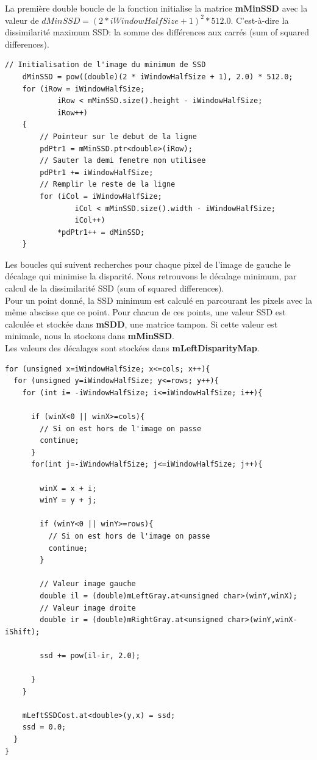 \documentclass[a4paper,11pt]{article}
\begin{document}
La première double boucle de la fonction initialise la matrice
\textbf{mMinSSD} avec la valeur de $dMinSSD = (2 * iWindowHalfSize + 1)^2 * 512.0$. 
C'est-à-dire la dissimilarité maximum SSD: la somme des différences aux carrés (sum of squared 
differences).

\begin{lstlisting}[caption=Initialisation]
    // Initialisation de l'image du minimum de SSD
    dMinSSD = pow((double)(2 * iWindowHalfSize + 1), 2.0) * 512.0;
    for (iRow = iWindowHalfSize;
            iRow < mMinSSD.size().height - iWindowHalfSize;
            iRow++)
    {
        // Pointeur sur le debut de la ligne
        pdPtr1 = mMinSSD.ptr<double>(iRow);
        // Sauter la demi fenetre non utilisee
        pdPtr1 += iWindowHalfSize;
        // Remplir le reste de la ligne
        for (iCol = iWindowHalfSize;
                iCol < mMinSSD.size().width - iWindowHalfSize;
                iCol++)
            *pdPtr1++ = dMinSSD;
    }
\end{lstlisting}

\newpage

Les boucles qui suivent recherches pour chaque pixel de l'image de gauche le décalage qui 
minimise la disparité. Nous retrouvons le décalage minimum, par calcul de la dissimilarité
SSD (sum of squared differences).\\

Pour un point donné, la SSD minimum est calculé en parcourant les pixels avec la même 
abscisse que ce point. Pour chacun de ces points, une valeur SSD est calculée et stockée 
dans \textbf{mSDD}, une matrice tampon. Si cette valeur est minimale, nous la stockons 
dans \textbf{mMinSSD}.\\

Les valeurs des décalages sont stockées dans \textbf{mLeftDisparityMap}.\\


\begin{lstlisting}[caption=Retrouver dissimilarité minimum]
for (unsigned x=iWindowHalfSize; x<=cols; x++){
  for (unsigned y=iWindowHalfSize; y<=rows; y++){
    for (int i= -iWindowHalfSize; i<=iWindowHalfSize; i++){

      if (winX<0 || winX>=cols){
        // Si on est hors de l'image on passe
        continue;
      }
      for(int j=-iWindowHalfSize; j<=iWindowHalfSize; j++){

        winX = x + i;
        winY = y + j;

        if (winY<0 || winY>=rows){
          // Si on est hors de l'image on passe
          continue;
        }

        // Valeur image gauche
        double il = (double)mLeftGray.at<unsigned char>(winY,winX);
        // Valeur image droite
        double ir = (double)mRightGray.at<unsigned char>(winY,winX-iShift);

        ssd += pow(il-ir, 2.0);

      }
    }

    mLeftSSDCost.at<double>(y,x) = ssd;
    ssd = 0.0;
  }
}
\end{lstlisting}
\end{document}
